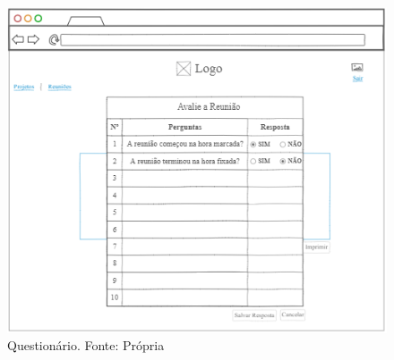 \begin{figure}[H]
    \centering
    \includegraphics[width=1.0\textwidth]{figuras/questionario.png}
    \caption{Questionário. Fonte: Própria}
    \label{img:prototipo_questionario_reuniao}
\end{figure}